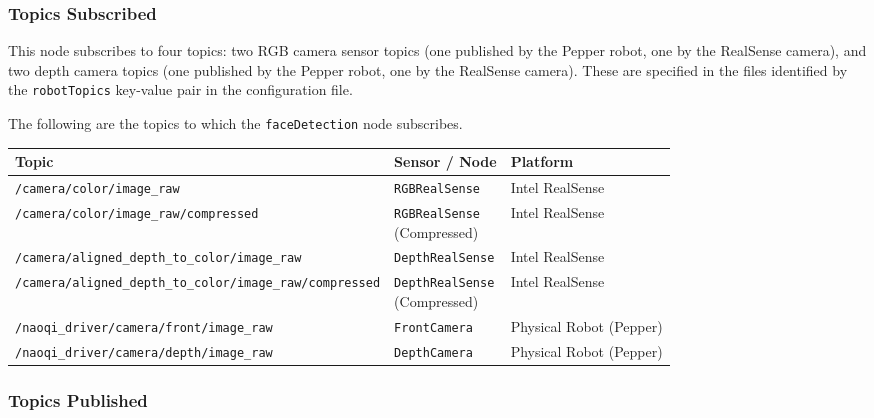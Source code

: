 \documentclass{CSSRforAfrica}
\begin{document}
{\subsubsection*{Topics Subscribed}

This node subscribes to four topics: two RGB camera sensor topics (one published by the Pepper robot, one by the RealSense camera), and two depth camera topics (one published by the Pepper robot, one by the RealSense camera).
These are specified in the files identified by the {\small \verb+robotTopics+ }  key-value pair in the configuration file.

\newpage

The following are the topics to which the \texttt{\small faceDetection}  node subscribes.

\begin{table}[!h]
	\centering
	{\fontsize{8.2}{11.0}\selectfont %
		\begin{tabularx}{\linewidth}{| l | l | X |}
			\hline
			\small{Topic} & \small{Sensor / Node} & \small{Platform} \\
			\hline
			\texttt{/camera/color/image\_raw} & \texttt{RGBRealSense} & Intel RealSense \\
			\hline
			\texttt{/camera/color/image\_raw/compressed} & \makecell[l]{\texttt{RGBRealSense} \\ (Compressed)} & Intel RealSense \\
			\hline
			\texttt{/camera/aligned\_depth\_to\_color/image\_raw} & \texttt{DepthRealSense} & Intel RealSense \\
			\hline
			\texttt{/camera/aligned\_depth\_to\_color/image\_raw/compressed} & \makecell[l]{\texttt{DepthRealSense} \\ (Compressed)} & Intel RealSense \\
			\hline
			\texttt{/naoqi\_driver/camera/front/image\_raw} & \texttt{FrontCamera} & Physical Robot (Pepper) \\
			\hline
			\texttt{/naoqi\_driver/camera/depth/image\_raw} & \texttt{DepthCamera} & Physical Robot (Pepper) \\
			\hline
		\end{tabularx}
	}
\end{table}



\subsubsection*{Topics Published}

}
\end{document}
